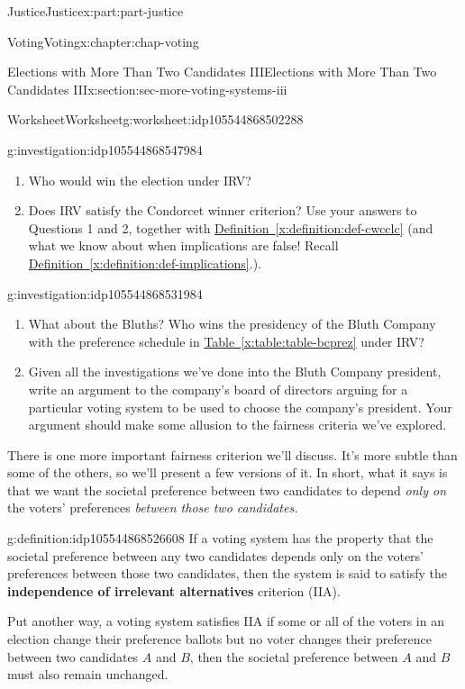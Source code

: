 \documentclass[oneside,10pt,]{book}
\newcommand{\xreffont}{\relax}
\newcommand{\terminology}[1]{\textbf{#1}}
\numberwithin{equation}{section}
\begin{document}
\begin{partptx}{Justice}{}{Justice}{}{}{x:part:part-justice}
\begin{chapterptx}{Voting}{}{Voting}{}{}{x:chapter:chap-voting}
\begin{sectionptx}{Elections with More Than Two Candidates III}{}{Elections with More Than Two Candidates III}{}{}{x:section:sec-more-voting-systems-iii}
\begin{worksheet-subsection}{Worksheet}{}{Worksheet}{}{}{g:worksheet:idp105544868502288}
\begin{investigation}{}{g:investigation:idp105544868547984}
\begin{enumerate}[label=(\alph*)]
\item{}Who would win the election under IRV?%
\item{}Does IRV satisfy the Condorcet winner criterion? Use your answers to Questions 1 and 2, together with \hyperref[x:definition:def-cwcclc]{Definition~{\xreffont\ref{x:definition:def-cwcclc}}} (and what we know about when implications are false! Recall \hyperref[x:definition:def-implications]{Definition~{\xreffont\ref{x:definition:def-implications}}}.).%
\end{enumerate}
\end{investigation}%
\begin{investigation}{}{g:investigation:idp105544868531984}%
%
\begin{enumerate}[label=(\alph*)]
\item{}What about the Bluths? Who wins the presidency of the Bluth Company with the preference schedule in \hyperref[x:table:table-bcprez]{Table~{\xreffont\ref{x:table:table-bcprez}}} under IRV?%
\item{}Given all the investigations we've done into the Bluth Company president, write an argument to the company's board of directors arguing for a particular voting system to be used to choose the company's president. Your argument should make some allusion to the fairness criteria we've explored.%
\end{enumerate}
\end{investigation}%
There is one more important fairness criterion we'll discuss. It's more subtle than some of the others, so we'll present a few versions of it. In short, what it says is that we want the societal preference between two candidates to depend \emph{only on} the voters' preferences \emph{between those two candidates.}%
\begin{definition}{}{g:definition:idp105544868526608}%
If a voting system has the property that the societal preference between any two candidates depends only on the voters' preferences between those two candidates, then the system is said to satisfy the \terminology{independence of irrelevant alternatives} criterion (IIA).%
\par
Put another way, a voting system satisfies IIA if some or all of the voters in an election change their preference ballots but no voter changes their preference between two candidates \(A\) and \(B\), then the societal preference between \(A\) and \(B\) must also remain unchanged.%
\end{definition}

\end{worksheet-subsection}
\end{sectionptx}
\end{chapterptx}
\end{partptx}
\end{document}
